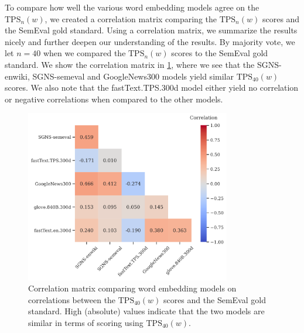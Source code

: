 To compare how well the various word embedding models agree on the $\text{TPS}_n(w)$, we created a correlation matrix comparing the $\text{TPS}_n(w)$ scores and the SemEval gold standard. Using a correlation matrix, we summarize the results nicely and further deepen our understanding of the results. By majority vote, we let $n=40$ when we compared the $\text{TPS}_n(w)$ scores to the SemEval gold standard. We show the correlation matrix in \cref{fig:correlation-matrix-tps-vs-gs}, where we see that the SGNS-enwiki, SGNS-semeval and GoogleNews300 models yield similar $\text{TPS}_{40}(w)$ scores. We also note that the fastText.TPS.300d model either yield no correlation or negative correlations when compared to the other models.
\begin{figure}[H]
    \centering
    \includegraphics[width=0.8\textwidth]{thesis/figures/correlation-matrix-tps-vs-gs.pdf}
    \caption{Correlation matrix comparing word embedding models on correlations between the $\text{TPS}_{40}(w)$ scores and the SemEval gold standard. High (absolute) values indicate that the two models are similar in terms of scoring using $\text{TPS}_{40}(w)$.}
    \label{fig:correlation-matrix-tps-vs-gs}
\end{figure}

